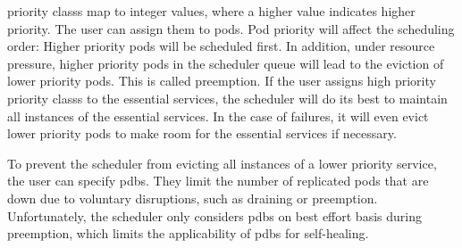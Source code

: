   \Glspl{priority class} map to integer values, where a higher value indicates higher priority.
  The user can assign them to pods.
  Pod priority will affect the scheduling order:
  Higher priority pods will be scheduled first.
  In addition, under resource pressure, higher priority pods in the scheduler queue will lead to the eviction of lower priority pods.
  This is called preemption.
  If the user assigns high priority \glspl{priority class} to the essential services, the scheduler will do its best to maintain all instances of the essential services.
  In the case of failures, it will even evict lower priority pods to make room for the essential services if necessary.

  To prevent the scheduler from evicting all instances of a lower priority service, the user can specify \glspl{pdb}.
  They limit the number of replicated pods that are down due to voluntary disruptions, such as draining or preemption.
  Unfortunately, the scheduler only considers \glspl{pdb} on best effort basis during preemption, which limits the applicability of \glspl{pdb} for self-healing.
